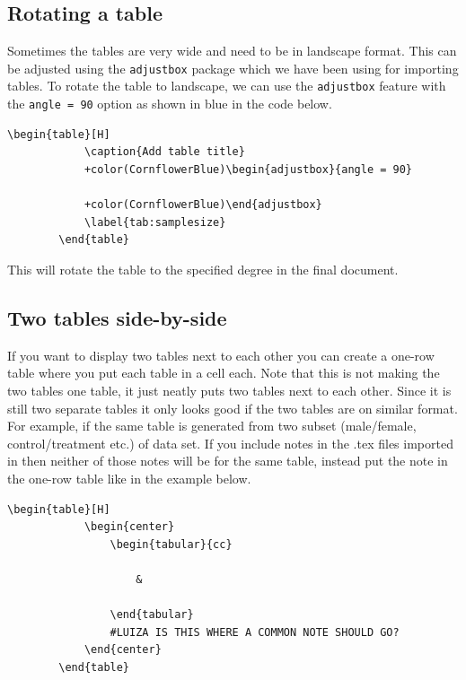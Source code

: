 \documentclass[12pts]{article}
\begin{document}
	\subsection{Rotating a table}
	
	Sometimes the tables are very wide and need to be in landscape format. This can be adjusted using the \texttt{adjustbox} package which we have been using for importing tables. To rotate the table to landscape, we can use the \texttt{adjustbox} feature with the \texttt{angle = 90} option as shown in blue in the code below.
	
	\begin{minipage}{\textwidth}
		\begin{Verbatim}[commandchars=+\(\)]
		\begin{table}[H]
			\caption{Add table title}
			+color(CornflowerBlue)\begin{adjustbox}{angle = 90} 
				
			+color(CornflowerBlue)\end{adjustbox}
			\label{tab:samplesize}
		\end{table}
		\end{Verbatim}
	\end{minipage}
	
	This will rotate the table to the specified degree in the final document. 
	
	\subsection{Two tables side-by-side}

	If you want to display two tables next to each other you can create a one-row table where you put each table in a cell each. Note that this is not making the two tables one table, it just neatly puts two tables next to each other. Since it is still two separate tables it only looks good if the two tables are on similar format. For example, if the same table is generated from two subset (male/female, control/treatment etc.) of data set. If you include notes in the .tex files imported in \verb|| then neither of those notes will be for the same table, instead put the note in the one-row table like in the example below.
	
	\begin{minipage}{\textwidth}
		\begin{Verbatim}[commandchars=+\(\)]
		\begin{table}[H]
			\begin{center}
				\begin{tabular}{cc}
					
					&
					
				\end{tabular}
				#LUIZA IS THIS WHERE A COMMON NOTE SHOULD GO?
			\end{center}
		\end{table}
		\end{Verbatim}
	\end{minipage} 	
	
\end{document}

